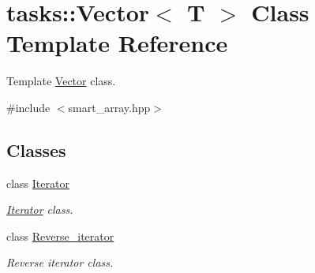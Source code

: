 \hypertarget{classtasks_1_1Vector}{}\section{tasks\+:\+:Vector$<$ T $>$ Class Template Reference}
\label{classtasks_1_1Vector}


Template \hyperlink{classtasks_1_1Vector}{Vector} class.  




{\ttfamily \#include $<$smart\+\_\+array.\+hpp$>$}

\subsection*{Classes}
\begin{DoxyCompactItemize}
\item 
class \hyperlink{classtasks_1_1Vector_1_1Iterator}{Iterator}
\begin{DoxyCompactList}\small\item\em \hyperlink{classtasks_1_1Vector_1_1Iterator}{Iterator} class. \end{DoxyCompactList}\item 
class \hyperlink{classtasks_1_1Vector_1_1Reverse__iterator}{Reverse\+\_\+iterator}
\begin{DoxyCompactList}\small\item\em Reverse iterator class. \end{DoxyCompactList}\end{DoxyCompactItemize}
